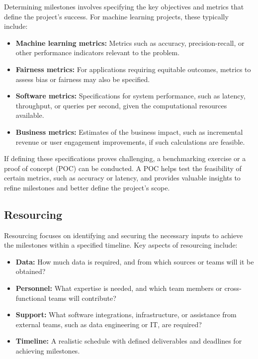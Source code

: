 \documentclass[12pt,openany, draft]{book}
\begin{document}
Determining milestones involves specifying the key objectives and metrics that define the project's success. For machine learning projects, these typically include:
\begin{itemize}
    \item \textbf{Machine learning metrics:} Metrics such as accuracy, precision-recall, or other performance indicators relevant to the problem.
    \item \textbf{Fairness metrics:} For applications requiring equitable outcomes, metrics to assess bias or fairness may also be specified.
    \item \textbf{Software metrics:} Specifications for system performance, such as latency, throughput, or queries per second, given the computational resources available.
    \item \textbf{Business metrics:} Estimates of the business impact, such as incremental revenue or user engagement improvements, if such calculations are feasible.
\end{itemize}

If defining these specifications proves challenging, a benchmarking exercise or a proof of concept (POC) can be conducted. A POC helps test the feasibility of certain metrics, such as accuracy or latency, and provides valuable insights to refine milestones and better define the project's scope.

\subsection{Resourcing}

Resourcing focuses on identifying and securing the necessary inputs to achieve the milestones within a specified timeline. Key aspects of resourcing include:
\begin{itemize}
    \item \textbf{Data:} How much data is required, and from which sources or teams will it be obtained?
    \item \textbf{Personnel:} What expertise is needed, and which team members or cross-functional teams will contribute?
    \item \textbf{Support:} What software integrations, infrastructure, or assistance from external teams, such as data engineering or IT, are required?
    \item \textbf{Timeline:} A realistic schedule with defined deliverables and deadlines for achieving milestones.
\end{itemize}
\end{document}
